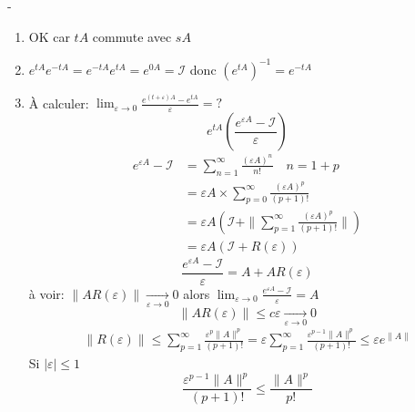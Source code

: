 \documentclass[a4paper]{report}
\theoremstyle{definition}
\begin{document}
\begin{preuve}-
    \begin{enumerate}
        \item OK car $tA$ commute avec  $sA$
        \item  $e^{tA}e^{-tA} = e^{-tA}e^{tA} = e^{0A} = \mathcal{I}$ donc  $(e^{tA})^{-1} = e^{-tA}$
        \item À calculer: $\lim_{\varepsilon \to 0} \frac{e^{(t + \varepsilon)A} - e^{tA}}{\varepsilon} = ?$ 
            \[
            e^{tA}(\frac{e^{\varepsilon A }- \mathcal{I}}{\varepsilon})
            \] 
            \begin{align*}
                e^{\varepsilon A} - \mathcal{I} &= \sum_{n=1}^{\infty} \frac{(\varepsilon A)^n}{n!} \quad n = 1 + p\\
                                                &= \varepsilon A \times \sum_{p=0}^{\infty} \frac{(\varepsilon A)^p}{(p+1)!}\\
                                                &= \varepsilon A \left( \mathcal{I} + \|\sum_{p=1}^{\infty} \frac{(\varepsilon A)^p}{(p+1)!}\| \right) \\
                                                &= \varepsilon A \left( \mathcal{I} + R(\varepsilon) \right) 
            \end{align*}
            \[
                \frac{e^{\varepsilon A} - \mathcal{I}}{\varepsilon} = A + AR(\varepsilon)
            \] 
            à voir: $\|AR(\varepsilon)\| \xrightarrow[\varepsilon \to 0]{} 0$ alors $\lim_{\varepsilon \to 0} \frac{e^{\varepsilon A} - \mathcal{I}}{\varepsilon} = A$
            \[
            \|AR(\varepsilon)\| \le c\varepsilon \xrightarrow[\varepsilon \to 0]{} 0
            \] 
            \begin{align*}
                \|R(\varepsilon)\| \le \sum_{p=1}^{\infty} \frac{\varepsilon^p \|A\|^p}{(p+1)!} = \varepsilon \sum_{p=1}^{\infty} \frac{\varepsilon^{p-1}\|A\|^p}{(p+1)!} \le \varepsilon e^{\|A\|}
            \end{align*}
            Si $|\varepsilon| \le 1$
            \[
                \frac{\varepsilon^{p-1} \|A\|^p}{(p+1)!} \le \frac{\|A\|^p}{p!}
            \] 
    \end{enumerate}
\end{preuve}
\end{document}
